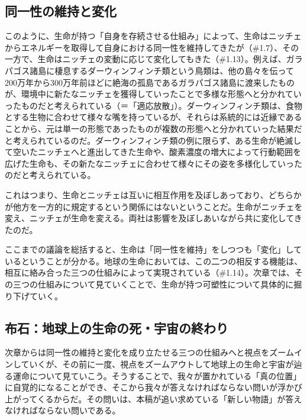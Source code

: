 \subsection{同一性の維持と変化}\label{ux540cux4e00ux6027ux306eux7dadux6301ux3068ux5909ux5316}

このように、生命が持つ「自身を存続させる仕組み」によって、生命はニッチェからエネルギーを取得して自身における同一性を維持してきたが（\#1.7）、その一方で、生命はニッチェの変動に応じて変化してもきた（\#1.13）。例えば、ガラパゴス諸島に棲息するダーウィンフィンチ類という鳥類は、他の島々を伝って200万年から300万年前ほどに絶海の孤島であるガラパゴス諸島に渡来したものが、環境中に新たなニッチェを獲得していったことで多様な形態へと分かれていったものだと考えられている（＝「適応放散」）。ダーウィンフィンチ類は、食物とする生物に合わせて様々な嘴を持っているが、それらは系統的には近縁であることから、元は単一の形態であったものが複数の形態へと分かれていった結果だと考えられているのだ。ダーウィンフィンチ類の例に限らず、ある生命が絶滅して空いたニッチェへと進出してきた生命や、酸素濃度の増大によって行動範囲を広げた生命も、その新たなニッチェに合わせて様々にその姿を多様化していったのだと考えられている。

これはつまり、生命とニッチェは互いに相互作用を及ぼしあっており、どちらかが他方を一方的に規定するという関係にはないということだ。生命がニッチェを変え、ニッチェが生命を変える。両社は影響を及ぼしあいながら共に変化してきたのだ。

ここまでの議論を総括すると、生命は「同一性を維持」をしつつも「変化」しているということが分かる。地球の生命においては、この二つの相反する機能は、相互に絡み合った三つの仕組みによって実現されている（\#1.14）。次章では、その三つの仕組みについて見ていくことで、生命が持つ可塑性について具体的に掘り下げていく。

\subsection{布石：地球上の生命の死・宇宙の終わり}\label{ux5e03ux77f3ux5730ux7403ux4e0aux306eux751fux547dux306eux6b7bux5b87ux5b99ux306eux7d42ux308fux308a}

次章からは同一性の維持と変化を成り立たせる三つの仕組みへと視点をズームインしていくが、その前に一度、視点をズームアウトして地球上の生命と宇宙が辿る運命について見ていこう。そうすることで、我々が置かれている「真の位置」に自覚的になることができ、そこから我々が答えなければならない問いが浮かび上がってくるからだ。その問いは、本稿が追い求めている「新しい物語」が答えなければならない問いである。

